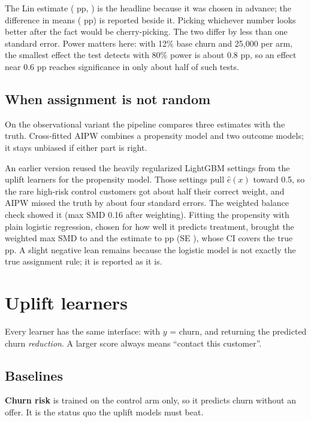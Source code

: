 \documentclass[11pt]{article}
\begin{document}

\begin{warn}
The Lin estimate (\RlinEst{} pp, \RlinSig) is the headline because it was chosen in advance; the difference in means (\RdimEst{} pp) is reported beside it. Picking whichever number looks better after the fact would be cherry-picking. The two differ by less than one standard error. Power matters here: with 12\% base churn and 25{,}000 per arm, the smallest effect the test detects with 80\% power is about 0.8 pp, so an effect near 0.6 pp reaches significance in only about half of such tests.
\end{warn}

\subsection{When assignment is not random}
On the observational variant the pipeline compares three estimates with the truth. Cross-fitted AIPW combines a propensity model and two outcome models; it stays unbiased if either part is right.


An earlier version reused the heavily regularized LightGBM settings from the uplift learners for the propensity model. Those settings pull $\hat e(x)$ toward 0.5, so the rare high-risk control customers got about half their correct weight, and AIPW missed the truth by about four standard errors. The weighted balance check showed it (max SMD 0.16 after weighting). Fitting the propensity with plain logistic regression, chosen for how well it predicts treatment, brought the weighted max SMD to \RsmdAfter{} and the estimate to \RobsAipw{} pp (SE \RobsAipwSE), whose CI covers the true \RtrueATE{} pp. A slight negative lean remains because the logistic model is not exactly the true assignment rule; it is reported as it is.

\section{Uplift learners}
\label{sec:learners}
Every learner has the same interface:  with $y$ = churn, and  returning the predicted churn \emph{reduction}. A larger score always means ``contact this customer''.

\subsection{Baselines}
\textbf{Churn risk} is trained on the control arm only, so it predicts churn without an offer. It is the status quo the uplift models must beat.
\end{document}

